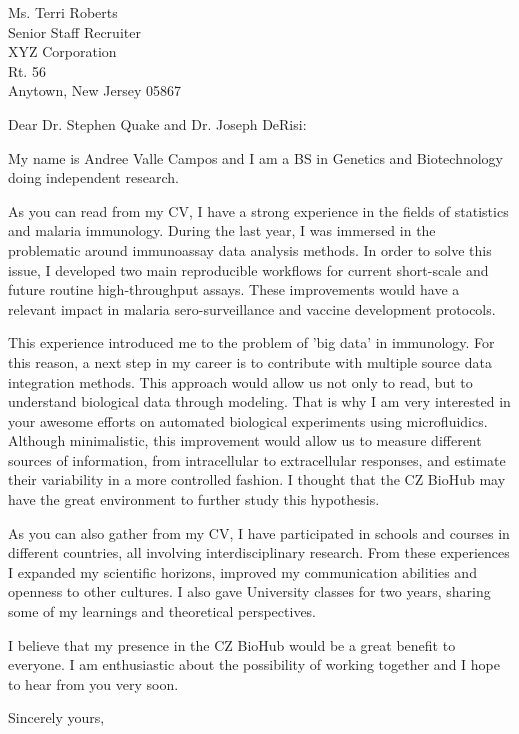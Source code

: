 \documentclass{letter} 					%
\begin{document}
\begin{letter}{
		Ms. Terri Roberts \\
		Senior Staff Recruiter \\
		XYZ Corporation \\
		Rt. 56 \\
		Anytown, New Jersey 05867
		}
%

 
\opening{Dear Dr. Stephen Quake and Dr. Joseph DeRisi:} 
 
\noindent My name is Andree Valle Campos and I am a BS in Genetics and Biotechnology doing independent research.

\noindent As you can read from my CV, I have a strong experience in the fields of statistics and malaria immunology. 
During the last year, I was immersed in the problematic around immunoassay data analysis methods. 
In order to solve this issue, I developed two main reproducible workflows for current short-scale and future routine high-throughput assays. 
These improvements would have a relevant impact in malaria sero-surveillance and vaccine development protocols.

\noindent This experience introduced me to the problem of 'big data' in immunology. 
For this reason, a next step in my career is to contribute with multiple source data integration methods. 
This approach would allow us not only to read, but to understand biological data through modeling. 
That is why I am very interested in your awesome efforts on automated biological experiments using microfluidics. 
Although minimalistic, this improvement would allow us to measure different sources of information, 
from intracellular to extracellular responses, and estimate their variability in a more controlled fashion. 
I thought that the CZ BioHub may have the great environment to further study this hypothesis.

\noindent As you can also gather from my CV, 
I have participated in schools and courses in different countries, all involving interdisciplinary research. 
From these experiences I expanded my scientific horizons, improved my communication abilities and openness to other cultures. 
I also gave University classes for two years, sharing some of my learnings and theoretical perspectives.

\noindent I believe that my presence in the CZ BioHub would be a great benefit to everyone. 
I am enthusiastic about the possibility of working together and I hope to hear from you very soon.
 
\closing{Sincerely yours,} 
  
\encl{}  				%


\end{letter}
\end{document}
